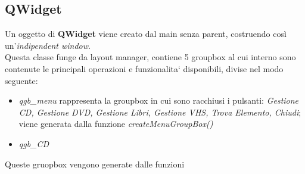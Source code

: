 {	\subsection{QWidget}{
		Un oggetto di \textbf{QWidget} viene creato dal main senza parent, costruendo così un'\textit{indipendent window}. \\
		Questa classe funge da layout manager, contiene 5 groupbox al cui interno sono contenute le principali operazioni e funzionalita` disponibili, divise nel modo seguente:
	\begin{itemize}\itemsep=0.5pt
		\item \textit{qgb_menu} rappresenta la groupbox in cui sono racchiusi i pulsanti:
			\textit{Gestione CD, Gestione DVD, Gestione Libri, Gestione VHS, Trova Elemento, Chiudi}; viene generata dalla funzione \textit{createMenuGroupBox()}
		\item \textit{qgb_CD}
	\end{itemize}
	Queste gruopbox vengono generate dalle funzioni
	}
}